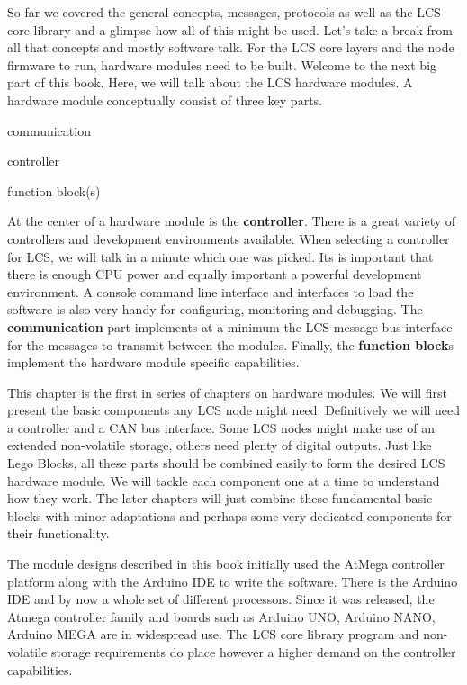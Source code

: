 
So far we covered the general concepts, messages, protocols as well as the LCS core library and a glimpse how all of this might be used. Let's take a break from all that concepts and mostly software talk. For the LCS core layers and the node firmware to run, hardware modules need to be built. Welcome to the next big part of this book. Here, we will talk about the LCS hardware modules. A hardware module conceptually consist of three key parts.

\begin{smallGapItemize}
\item communication
\item controller
\item function block(s)
\end{smallGapItemize}

At the center of a hardware module is the \textbf{controller}. There is a great variety of controllers and development environments available. When selecting a controller for LCS, we will talk in a minute which one was picked. Its is important that there is enough CPU power and equally important a powerful development environment. A console command line interface and interfaces to load the software is also very handy for configuring, monitoring and debugging. The \textbf{communication} part implements at a minimum the LCS message bus interface for the messages to transmit between the modules. Finally, the \textbf{function block}s implement the hardware module specific capabilities.

 This chapter is the first in series of chapters on hardware modules. We will first present the basic components any LCS node might need. Definitively we will need a controller and a CAN bus interface. Some LCS nodes might make use of an extended non-volatile storage, others need plenty of digital outputs. Just like Lego Blocks, all these parts should be combined easily to form the desired LCS hardware module. We will tackle each component one at a time to understand how they work. The later chapters will just combine these fundamental basic blocks with minor adaptations and perhaps some very dedicated components for their functionality.


The module designs described in this book initially used the AtMega controller platform along with the Arduino IDE to write the software. There is the Arduino IDE and by now a whole set of different processors. Since it was released, the Atmega controller family and boards such as Arduino UNO, Arduino NANO, Arduino MEGA are in widespread use. The LCS core library program and non-volatile storage requirements do place however a higher demand on the controller capabilities.


